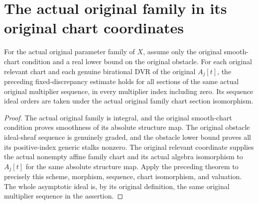\section{The actual original family in its original chart coordinates}

\begin{corollary}
\label{cor:c0n-original-family-chart-estimate}
\leanok
For the actual original parameter family of $X$, assume only the original
smooth-chart condition and a real lower bound on the original obstacle.
For each original relevant chart and each genuine birational DVR of the
original $A_j[t]$, the preceding fixed-discrepancy estimate holds for all
sections of the same actual original multiplier sequence, in every
multiplier index including zero.  Its sequence ideal orders are taken
under the actual original family chart section isomorphism.
\end{corollary}
\begin{proof}
The actual original family is integral, and the original smooth-chart
condition proves smoothness of its absolute structure map.
The original obstacle ideal-sheaf sequence is genuinely graded, and the
obstacle lower bound proves all its positive-index generic stalks nonzero.
The original relevant coordinate supplies the actual nonempty affine
family chart and its actual algebra isomorphism to $A_j[t]$ for the same
absolute structure map.  Apply the preceding theorem to precisely this
scheme, morphism, sequence, chart isomorphism, and valuation.
The whole asymptotic ideal is, by its original definition, the same
original multiplier sequence in the assertion.
\end{proof}
